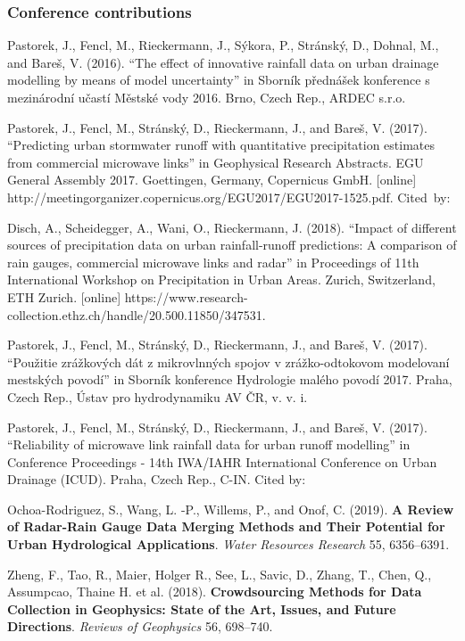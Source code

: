 \documentclass{ctuthesis}\usepackage[]{graphicx}\usepackage[]{color}
\begin{document}
\subsubsection*{Conference contributions}

\begin{description}

\item Pastorek, J., Fencl, M., Rieckermann, J., Sýkora, P., Stránský, D., Dohnal, M., and Bareš, V. (2016). “The effect of innovative rainfall data on urban drainage modelling by means of model uncertainty” in Sborník přednášek konference s mezinárodní učastí Městské vody 2016. Brno, Czech Rep., ARDEC s.r.o.

\item Pastorek, J., Fencl, M., Stránský, D., Rieckermann, J., and Bareš, V. (2017). “Predicting urban stormwater runoff with quantitative precipitation estimates from commercial microwave links” in Geophysical Research Abstracts. EGU General Assembly 2017. Goettingen, Germany, Copernicus GmbH. [online] http://meetingorganizer.copernicus.org/EGU2017/EGU2017-1525.pdf.
Cited~by:
        \begin{description}
                \item Disch, A., Scheidegger, A., Wani, O., Rieckermann, J. (2018). “Impact of different sources of precipitation data on urban rainfall-runoff predictions: A comparison of rain gauges, commercial microwave links and radar” in Proceedings of 11th International Workshop on Precipitation in Urban Areas. Zurich, Switzerland, ETH Zurich. [online] https://www.research-collection.ethz.ch/handle/20.500.11850/347531.
        \end{description}

\item Pastorek, J., Fencl, M., Stránský, D., Rieckermann, J., and Bareš, V. (2017). “Použitie zrážkových dát z mikrovlnných spojov v zrážko-odtokovom modelovaní mestských povodí” in Sborník konference Hydrologie malého povodí 2017. Praha, Czech Rep., Ústav pro hydrodynamiku AV ČR, v. v. i.

\item Pastorek, J., Fencl, M., Stránský, D., Rieckermann, J., and Bareš, V. (2017). “Reliability of microwave link rainfall data for urban runoff modelling” in Conference Proceedings - 14th IWA/IAHR International Conference on Urban Drainage (ICUD). Praha, Czech Rep., C-IN.
Cited by:
        \begin{description}
                \item Ochoa-Rodriguez, S., Wang, L. -P., Willems, P., and Onof, C. (2019). \textbf{A Review of Radar-Rain Gauge Data Merging Methods and Their Potential for Urban Hydrological Applications}. \emph{Water Resources Research} 55, 6356--6391.
                \item Zheng, F., Tao, R., Maier, Holger R., See, L., Savic, D., Zhang, T., Chen, Q., Assumpcao, Thaine H. et al. (2018). \textbf{Crowdsourcing Methods for Data Collection in Geophysics: State of the Art, Issues, and Future Directions}. \emph{Reviews of Geophysics} 56, 698--740. 
        \end{description}



\end{description}
\end{document}
